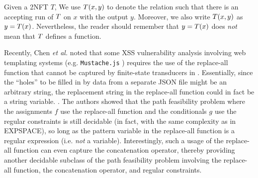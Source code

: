 Given a 2NFT $T$, We use $T(x, y)$ to denote the relation such that there is an accepting run of $T$ on $x$ with the output $y$.
Moreover, we also write $T(x, y)$ as $y = T(x)$.
Nevertheless, the reader should remember that $y= T(x)$ does \emph{not} mean that $T$ defines a function.




Recently, Chen \emph{et al.} \cite{CCHLW18}  noted that some XSS vulnerability
analysis involving web templating systems (e.g. \texttt{Mustache.js}
\cite{Mustache}) requires the use of the replace-all function that cannot be
captured by finite-state transducers in \cite{LB16}. Essentially, since the ``holes'' to be 
filled in by data from a separate JSON file might be an arbitrary string, the
replacement string in the replace-all function could in fact be a string
variable. . The authors
showed that the path feasibility problem where the assignments $f$ use the
replace-all function and the conditionals $g$ use the regular constraints 
is still decidable (in fact, with the same complexity as in \cite{LB16} 
EXPSPACE), so long as the pattern variable in the replace-all function is a
regular expression (i.e. \emph{not} a variable). Interestingly, such a usage of
the replace-all function can even capture the concatenation operator, thereby
providing another decidable subclass of the path feasibility problem involving
the replace-all function, the concatenation operator, and regular constraints.

 

